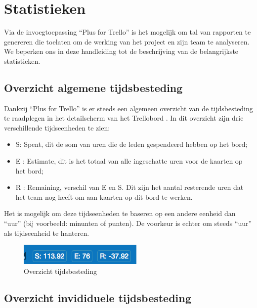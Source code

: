 \chapter{Statistieken}

Via de invoegtoepassing ``Plus for Trello'' is het mogelijk om tal van rapporten te genereren die toelaten om de werking van het project en zijn team te analyseren. We beperken ons in deze handleiding tot de beschrijving van de belangrijkste statistieken.

\section{Overzicht algemene tijdsbesteding}

Dankzij ``Plus for Trello'' is er steeds een algemeen overzicht van de tijdsbesteding te raadplegen in het detailscherm van het Trellobord . In dit overzicht zijn drie verschillende tijdseenheden te zien:
\begin{itemize}
	\item S: Spent, dit de som van uren die de leden gespendeerd hebben op het bord;
	\item E : Estimate, dit is het totaal van alle ingeschatte uren voor de kaarten op het bord;
	\item R : Remaining, verschil van E en S. Dit zijn het aantal resterende uren dat het team nog heeft om aan kaarten op dit bord te werken.
\end{itemize}
Het is mogelijk om deze tijdseenheden te baseren op een andere eenheid dan ``uur'' (bij voorbeeld: minunten of punten). De voorkeur is echter om steeds ``uur'' als tijdseenheid te hanteren.
\begin{figure}
	\centering
	\includegraphics[scale=0.75]{./afbeeldingen/stats.png}
	\caption{Overzicht tijdsbesteding}
	\label{fig:stats}	
\end{figure} 

\section{Overzicht invididuele tijdsbesteding}

